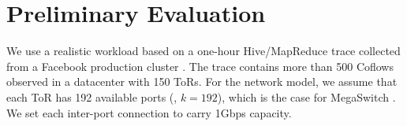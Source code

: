 
\section{Preliminary Evaluation}

\label{sec:eval}
We use a realistic workload based on a
one-hour Hive/MapReduce trace collected from a Facebook
production cluster \cite{coflow-benchmark}. The trace contains more
than 500 Coflows observed in a datacenter with 150 ToRs.
For the network model, we assume that each ToR has 192 available ports (\ie, $k=192$), which is the case for MegaSwitch \cite{megaswitch}. We set each inter-port connection to carry 1Gbps capacity. %

\begin{figure}[t]
  \centering
\hfill
\end{figure}
